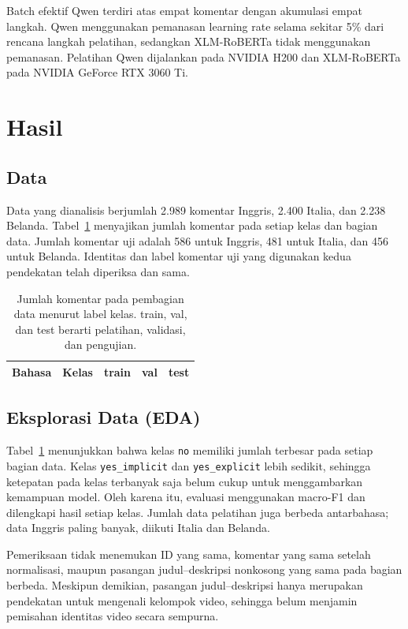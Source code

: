 \documentclass[11pt]{article}
\begin{document}
Batch efektif Qwen terdiri atas empat komentar dengan akumulasi empat langkah. Qwen menggunakan pemanasan learning rate selama sekitar 5\% dari rencana langkah pelatihan, sedangkan XLM-RoBERTa tidak menggunakan pemanasan. Pelatihan Qwen dijalankan pada NVIDIA H200 dan XLM-RoBERTa pada NVIDIA GeForce RTX 3060 Ti.

\section{Hasil}
\subsection{Data}
Data yang dianalisis berjumlah 2.989 komentar Inggris, 2.400 Italia, dan 2.238 Belanda. Tabel~\ref{tab:data} menyajikan jumlah komentar pada setiap kelas dan bagian data. Jumlah komentar uji adalah 586 untuk Inggris, 481 untuk Italia, dan 456 untuk Belanda. Identitas dan label komentar uji yang digunakan kedua pendekatan telah diperiksa dan sama.

\begin{table}[t]
\centering
\small
\setlength{\tabcolsep}{3pt}
\begin{tabular}{llrrr}
\toprule
Bahasa & Kelas & train & val & test \\
\midrule

\end{tabular}
\caption{Jumlah komentar pada pembagian data menurut label kelas. train, val, dan test berarti pelatihan, validasi, dan pengujian.}
\label{tab:data}
\end{table}

\subsection{Eksplorasi Data (EDA)}
Tabel~\ref{tab:data} menunjukkan bahwa kelas \texttt{no} memiliki jumlah terbesar pada setiap bagian data. Kelas \texttt{yes\_implicit} dan \texttt{yes\_explicit} lebih sedikit, sehingga ketepatan pada kelas terbanyak saja belum cukup untuk menggambarkan kemampuan model. Oleh karena itu, evaluasi menggunakan macro-F1 dan dilengkapi hasil setiap kelas. Jumlah data pelatihan juga berbeda antarbahasa; data Inggris paling banyak, diikuti Italia dan Belanda.

Pemeriksaan tidak menemukan ID yang sama, komentar yang sama setelah normalisasi, maupun pasangan judul--deskripsi nonkosong yang sama pada bagian berbeda. Meskipun demikian, pasangan judul--deskripsi hanya merupakan pendekatan untuk mengenali kelompok video, sehingga belum menjamin pemisahan identitas video secara sempurna.
\end{document}
